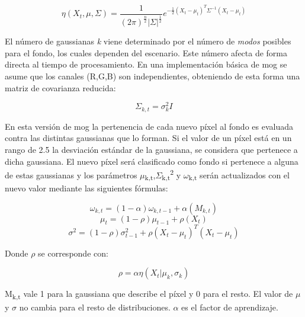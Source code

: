 \begin{equation}\label{eta_formula}
\eta(X_{t},\mu,\Sigma) = \frac{1}{(2\pi)^{\frac{n}{2}}|\Sigma|^{\frac{1}{2}}}e^{-\frac{1}{2}(X_{t}-\mu_{t})^{T}\Sigma^{-1}(X_{t}-\mu_{t})}
\end{equation}

El número de gaussianas \textit{k} viene determinado por el número de \textit{modos} posibles para el fondo, los cuales dependen del escenario. Este número afecta de forma directa  al  tiempo  de  procesamiento. En una implementación básica de \acrshort{mog} se  asume que los canales (R,G,B) son independientes, obteniendo de esta forma una matriz de covarianza reducida:

\begin{equation}\label{covarianza_formula}
\Sigma_{k,t}=\sigma_{k}^2I
\end{equation}

En esta versión de \acrshort{mog} la pertenencia de cada nuevo píxel al fondo es evaluada contra las distintas gaussianas que lo forman. Si el valor de un píxel está en un rango de 2.5 la desviación estándar de la gaussiana, se considera que pertenece a dicha gaussiana. El nuevo píxel será clasificado como fondo si pertenece a alguna de estas gaussianas y los parámetros $\mu$\textsubscript{k,t},$\Sigma$\textsubscript{k,t}\textsuperscript{2} y $\omega$\textsubscript{k,t} serán actualizados con el nuevo valor mediante las siguientes fórmulas:

\begin{equation}\label{gaussiana_formula1}
\omega_{k,t}=(1-\alpha)\omega_{k,t-1}+\alpha(M_{k,t})
\end{equation}
\begin{equation}\label{gaussiana_formula2}
\mu_{t}=(1-\rho)\mu_{t-1}+\rho(X_{t})
\end{equation}
\begin{equation}\label{gaussiana_formula3}
\sigma^2=(1-\rho)\sigma_{t-1}^2+\rho(X_{t}-\mu_{t})^T(X_{t}-\mu_{t})
\end{equation}

Donde $\rho$ se corresponde con:

\begin{equation}\label{ro_formula}
\rho=\alpha\eta(X_{t}|\mu_{k},\sigma_{k})
\end{equation}

M\textsubscript{k,t} vale 1 para la gaussiana que describe el píxel y 0 para el resto. El valor de $\mu$ y $\sigma$ no cambia para el resto de distribuciones. $\alpha$ es el factor de aprendizaje.

